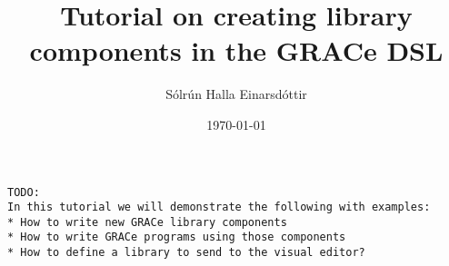 \documentclass[a4paper,11pt]{article}
\title{Tutorial on creating library components in the GRACe DSL}
\author{Sólrún Halla Einarsdóttir}
\date{\today}
\begin{document}
\maketitle
\begin{verbatim}
TODO:
In this tutorial we will demonstrate the following with examples:
* How to write new GRACe library components
* How to write GRACe programs using those components
* How to define a library to send to the visual editor?
\end{verbatim}
\end{document}
